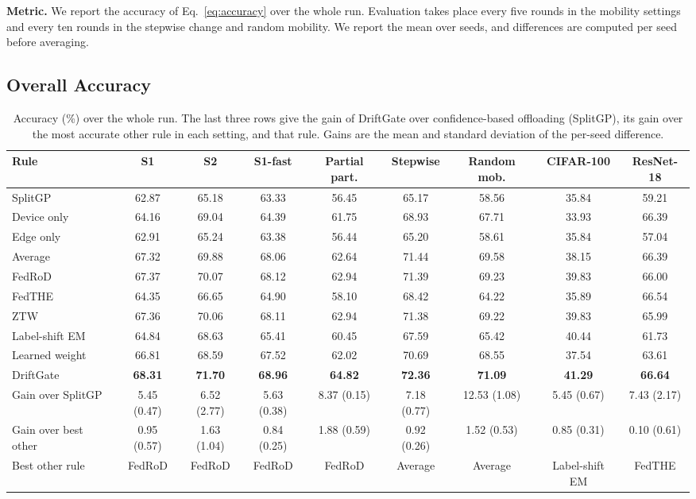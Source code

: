 \textbf{Metric.} We report the accuracy of Eq.~\eqref{eq:accuracy} over the whole run. Evaluation takes place every five rounds in the mobility settings and every ten rounds in the stepwise change and random mobility. We report the mean over seeds, and differences are computed per seed before averaging.

\subsection{Overall Accuracy}
\label{sec:overall}

\begin{table}[t]
\centering
\caption{Accuracy (\%) over the whole run. The last three rows give the gain of DriftGate over confidence-based offloading (SplitGP), its gain over the most accurate other rule in each setting, and that rule. Gains are the mean and standard deviation of the per-seed difference.}
\label{tab:main}
\begin{adjustbox}{max width=\textwidth}
\begin{tabular}{lcccccccc}
\toprule
Rule & S1 & S2 & S1-fast & Partial part. & Stepwise & Random mob. & CIFAR-100 & ResNet-18 \\
\midrule
SplitGP & 62.87 & 65.18 & 63.33 & 56.45 & 65.17 & 58.56 & 35.84 & 59.21 \\
Device only & 64.16 & 69.04 & 64.39 & 61.75 & 68.93 & 67.71 & 33.93 & 66.39 \\
Edge only & 62.91 & 65.24 & 63.38 & 56.44 & 65.20 & 58.61 & 35.84 & 57.04 \\
Average & 67.32 & 69.88 & 68.06 & 62.64 & 71.44 & 69.58 & 38.15 & 66.39 \\
FedRoD & 67.37 & 70.07 & 68.12 & 62.94 & 71.39 & 69.23 & 39.83 & 66.00 \\
FedTHE & 64.35 & 66.65 & 64.90 & 58.10 & 68.42 & 64.22 & 35.89 & 66.54 \\
ZTW & 67.36 & 70.06 & 68.11 & 62.94 & 71.38 & 69.22 & 39.83 & 65.99 \\
Label-shift EM & 64.84 & 68.63 & 65.41 & 60.45 & 67.59 & 65.42 & 40.44 & 61.73 \\
Learned weight & 66.81 & 68.59 & 67.52 & 62.02 & 70.69 & 68.55 & 37.54 & 63.61 \\
DriftGate & \textbf{68.31} & \textbf{71.70} & \textbf{68.96} & \textbf{64.82} & \textbf{72.36} & \textbf{71.09} & \textbf{41.29} & \textbf{66.64} \\
\midrule
Gain over SplitGP & 5.45 (0.47) & 6.52 (2.77) & 5.63 (0.38) & 8.37 (0.15) & 7.18 (0.77) & 12.53 (1.08) & 5.45 (0.67) & 7.43 (2.17) \\
Gain over best other & 0.95 (0.57) & 1.63 (1.04) & 0.84 (0.25) & 1.88 (0.59) & 0.92 (0.26) & 1.52 (0.53) & 0.85 (0.31) & 0.10 (0.61) \\
Best other rule & FedRoD & FedRoD & FedRoD & FedRoD & Average & Average & Label-shift EM & FedTHE \\
\bottomrule
\end{tabular}
\end{adjustbox}
\end{table}

